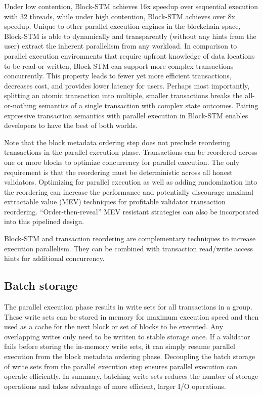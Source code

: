 \documentclass{article}
\begin{document}
Under low contention, Block-STM achieves 16x speedup over sequential execution with 32 threads, while under high contention, Block-STM achieves over 8x speedup. Unique to other parallel execution engines in the blockchain space, Block-STM is able to dynamically and transparently (without any hints from the user) extract the inherent parallelism from any workload.  In comparison to parallel execution environments that require upfront knowledge of data locations to be read or written, Block-STM can support more complex transactions concurrently. This property leads to fewer yet more efficient transactions, decreases cost, and provides lower latency for users. Perhaps most importantly, splitting an atomic transaction into multiple, smaller transactions breaks the all-or-nothing semantics of a single transaction with complex state outcomes. Pairing expressive transaction semantics with parallel execution in Block-STM enables developers to have the best of both worlds.

Note that the block metadata ordering step does not preclude reordering transactions in the parallel execution phase. Transactions can be reordered across one or more blocks to optimize concurrency for parallel execution. The only requirement is that the reordering must be deterministic across all honest validators. Optimizing for parallel execution as well as adding randomization into the reordering can increase the performance and potentially discourage maximal extractable value (MEV) techniques for profitable validator transaction reordering. ``Order-then-reveal'' MEV resistant strategies can also be incorporated into this pipelined design.

Block-STM and transaction reordering are complementary techniques to increase execution parallelism. They can be combined with transaction read/write access hints for additional concurrency.

\subsection{Batch storage}

The parallel execution phase results in write sets for all transactions in a group. These write sets can be stored in memory for maximum execution speed and then used as a cache for the next block or set of blocks to be executed. Any overlapping writes only need to be written to stable storage once. If a validator fails before storing the in-memory write sets, it can simply resume parallel execution from the block metadata ordering phase. Decoupling the batch storage of write sets from the parallel execution step ensures parallel execution can operate efficiently.  In summary, batching write sets reduces the number of storage operations and takes advantage of more efficient, larger I/O operations.
\end{document}
